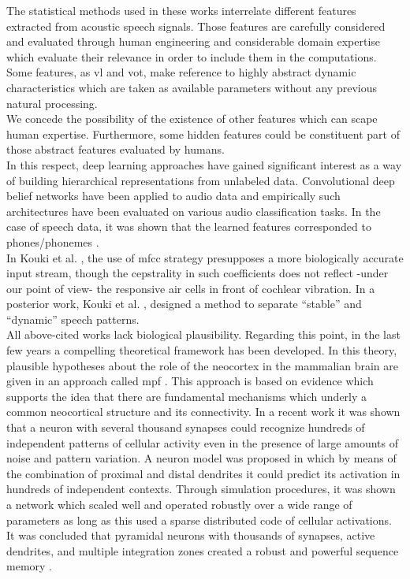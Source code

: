\documentclass[11pt,a4paper]{article}
\begin{document}
The statistical methods used in these works interrelate
different features extracted from acoustic speech signals.
Those features are carefully considered and evaluated
through human engineering and considerable domain expertise
which evaluate their relevance in order to include them
in the computations.
Some features, as \gls{vl} and \gls{vot},
make reference to highly abstract dynamic characteristics
which are taken
as available parameters without any previous natural
processing.\\

We concede the possibility of the existence of other
features which can scape human expertise.
Furthermore, some hidden features could be constituent
part of those abstract features evaluated by humans. \\

In this respect, deep learning approaches have gained significant interest as a
way of building hierarchical representations from unlabeled data.
Convolutional deep belief networks have been applied to audio data and empirically
such architectures have been evaluated on various audio classification
tasks. In the case of speech data, it was shown that the learned features corresponded
to phones/phonemes \cite{Lee:2009:UFL:2984093.2984217}. \\

In Kouki et al. \cite{kouki_2010},
the use of \gls{mfcc}
strategy presupposes a more biologically accurate input stream,
though the cepstrality in such coefficients does not reflect
-under our point of view-
the responsive air cells in front of cochlear vibration.
In a posterior work, Kouki et al. \cite{kouki_2011},
designed a method to separate “stable” and “dynamic” speech
patterns. \\

All above-cited works lack biological plausibility.
Regarding this point, in the last few years a compelling
theoretical framework has been developed.
In this theory, plausible hypotheses about the role of
the neocortex in the mammalian brain are given in an
approach called \gls{mpf}
\cite{hawkins_2004}.
This approach is based on evidence
which supports the idea that there are fundamental
mechanisms which underly a common neocortical
structure and its connectivity.
In a recent work it was shown that a neuron with
several thousand synapses could recognize hundreds
of independent patterns of cellular activity even
in the presence of large amounts of
noise and pattern variation.
A neuron model was proposed in which by means of
the combination of proximal and distal dendrites
it could predict its activation in hundreds of independent contexts.
Through simulation procedures, it was shown a network which
scaled well and operated robustly over a wide range of parameters as long as this
used a sparse distributed code of cellular activations.
It was concluded that pyramidal neurons with thousands of
synapses, active dendrites, and multiple integration zones
created a robust and powerful
sequence memory \cite{hawkins_2016}. \\
\end{document}
